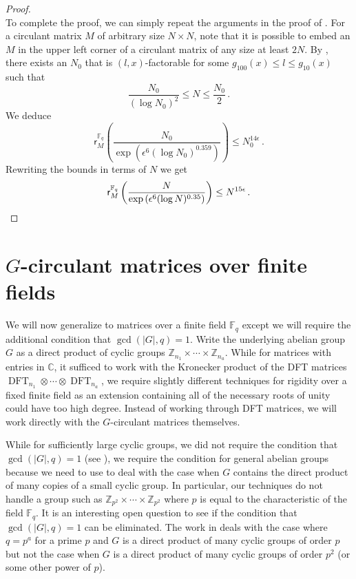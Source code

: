 \documentclass{toc}
\newcommand\F{{\mathbb{F}}}
\renewcommand\Z{{\mathbb{Z}}}
\renewcommand\C{{\mathbb{C}}}
\DeclareMathOperator{\DFT}{DFT}
\begin{document}
\begin{proof}
\[\]
To complete the proof, we can simply repeat the arguments in the proof of .  For a circulant matrix $M$ of arbitrary size $N \times N$, note that it is possible to embed an $M$ in the upper left corner of a circulant matrix of any size at least $2N$.  By , there exists an $N_0$ that is $(l,x)$-factorable for some $g_{100}(x) \leq l \leq g_{10}(x)$ such that
\[
\frac{N_0}{(\log N_0)^2} \leq N \leq \frac{N_0}{2} \,.
\]
We deduce
\[
\textsf{r}_{M}^{\F_q}\left(\frac{N_0}{\exp\left(\epsilon^6(\log N_0)^{0.359}\right)}\right) \leq N_0^{14 \epsilon} \,.
\]
Rewriting the bounds in terms of $N$ we get
\[
\textsf{r}_{M}^{\F_q}\left(\frac{N}{\exp\left(\epsilon^6(\log N)^{0.35}\right)}\right) \leq N^{15 \epsilon} \,. \qedhere
\]
\end{proof}


%
\section{\texorpdfstring{$G$}{G}-circulant matrices over finite fields} %
\label{sec_groupalgebra_finitefield}
We will now generalize  to matrices over a finite field $\F_q$ except we will require the additional condition that $\gcd(|G|,q) = 1$.  Write the underlying abelian group $G$ as a direct product of cyclic groups $\Z_{n_1} \times \cdots \times \Z_{n_a}$.  While for matrices with entries in $\C$, it sufficed to work with the Kronecker product of the DFT 
matrices $\DFT_{n_1} \otimes \cdots \otimes \DFT_{n_a}$, 
%
we require slightly different techniques for rigidity over a fixed finite field as an extension containing all of the necessary roots of unity could have too high degree.  Instead of working through DFT 
matrices, we will work directly with the $G$-circulant matrices themselves.  

While for sufficiently large cyclic groups, we did not require the condition that $\gcd(|G|,q) = 1$ (see ), we require the condition for general abelian groups because we need to use 
%
 to deal with the case when $G$ contains the direct product of many copies of a small cyclic group.  In particular, our techniques do not handle a group such as $\Z_{p^2} \times \cdots \times \Z_{p^2}$ where $p$ is equal to the characteristic of the field $\F_q$.  It is an interesting open question to see if the condition that $\gcd(|G|,q) = 1$ can be eliminated.  The work in \cite{CLP} deals with the case where $q = p^a$ for a prime $p$ and $G$ is a direct product of many cyclic groups of order $p$ but not the case when $G$ is a direct product of many cyclic groups of order $p^2$ (or some other power of $p$).
\end{document}
